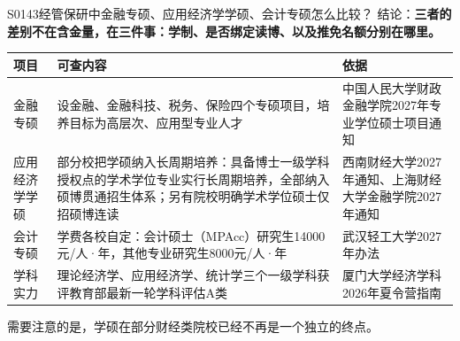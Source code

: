 \begin{qa}{S0143}{经管保研中金融专硕、应用经济学学硕、会计专硕怎么比较？}
结论：\textbf{三者的差别不在含金量，在三件事：学制、是否绑定读博、以及推免名额分别在哪里。}

\par\vspace{2pt}\nobreak\begin{center}\footnotesize
\begin{tabularx}{\textwidth}{>{\raggedright\arraybackslash}X>{\raggedright\arraybackslash}X>{\raggedright\arraybackslash}X}
\toprule
\textbf{项目} & \textbf{可查内容} & \textbf{依据} \\ \midrule
金融专硕 & 设金融、金融科技、税务、保险四个专硕项目，培养目标为高层次、应用型专业人才 & 中国人民大学财政金融学院2027年专业学位硕士项目通知 \\
应用经济学学硕 & 部分校把学硕纳入长周期培养：具备博士一级学科授权点的学术学位专业实行长周期培养，全部纳入硕博贯通招生体系；另有院校明确学术学位硕士仅招硕博连读 & 西南财经大学2027年通知、上海财经大学金融学院2027年通知 \\
会计专硕 & 学费各校自定：会计硕士（MPAcc）研究生14000元/人·年，其他专业研究生8000元/人·年 & 武汉轻工大学2027年办法 \\
学科实力 & 理论经济学、应用经济学、统计学三个一级学科获评教育部最新一轮学科评估A类 & 厦门大学经济学科2026年夏令营指南 \\
\bottomrule
\end{tabularx}
\end{center}\vspace{2pt}\par

需要注意的是，学硕在部分财经类院校已经不再是一个独立的终点。
\end{qa}

